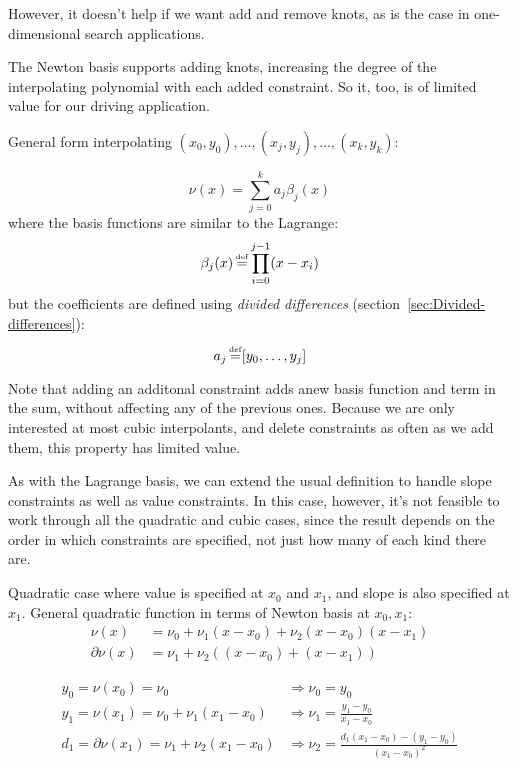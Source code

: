 However, it doesn't help if we want add and remove knots,
as is the case in one-dimensional search applications.

The Newton basis supports adding knots, increasing the degree
of the interpolating polynomial with each added constraint.
So it, too, is of limited value for our driving application.

General form interpolating 
$(x_{0},y_{0}),\ldots ,(x_{j},y_{j}),\ldots ,(x_{k},y_{k})$:

\begin{equation}
\nu(x) = \sum _{{j=0}}^{{k}}a_{{j}} {\beta}_{{j}}(x)
\end{equation}
where the basis functions are similar to the Lagrange:
\begin{equation}
{\beta}_{j}(x) \operatorname*{\overset{\underset{\mathrm{def}}{}}{=}} \prod_{{i=0}}^{{j-1}}(x-x_{i})
\end{equation}
but the coefficients are defined using 
\textit{divided differences} 
(section~\ref{sec:Divided-differences}):
\begin{equation}
a_{j} \operatorname*{\overset{\underset{\mathrm{def}}{}}{=}} [y_{0},\ldots ,y_{j}] 
\end{equation}

Note that adding an additonal constraint
adds anew basis function and term in the sum, without affecting 
any of the previous ones.
Because we are only interested at most cubic interpolants,
and delete constraints as often as we add them,
this property has limited value.

As with the Lagrange basis, we can extend the usual definition
to handle slope constraints as well as value constraints.
In this case, however, it's not feasible to work through
all the quadratic and cubic cases, since the result depends
on the order in which constraints are specified, not just
how many of each kind there are.


Quadratic case where value is specified at $x_0$ and $x_1$,
and slope is also specified at $x_1$.
General quadratic function in terms of Newton basis at
$x_0, x_1$:
\begin{align}
\nu(x) & = \nu_0 + \nu_1 (x - x_0) + \nu_2 (x - x_0) (x - x_1) 
\\
\partial{\nu}(x) & = \nu_1 + \nu_2 \left( (x - x_0) + (x - x_1) \right)
\nonumber
\end{align}

\begin{align}
y_0 = \nu(x_0) = \nu_0 & \Rightarrow \nu_0 = y_0 
\\
y_1 = \nu(x_1) = \nu_0 + \nu_1 (x_1 - x_0) & \Rightarrow 
\nu_1 = \frac{y_1-y_0}{x_1 - x_0} 
\nonumber \\
d_1 = \partial{\nu}(x_1) = \nu_1 + \nu_2 (x_1 - x_0) & \Rightarrow 
\nu_2 = \frac{d_1 (x_1 - x_0) - (y_1-y_0)}{(x_1 - x_0)^2} 
\nonumber
\end{align}

